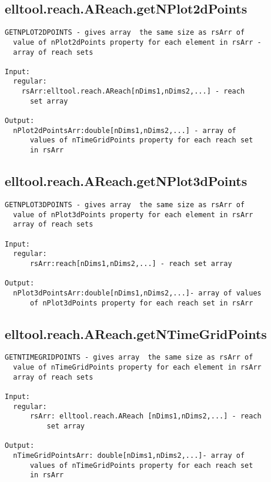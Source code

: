 \subsection{\texorpdfstring{elltool.reach.AReach.getNPlot2dPoints}{getNPlot2dPoints}}\label{method:elltool.reach.AReach.getNPlot2dPoints}
\begin{verbatim}
GETNPLOT2DPOINTS - gives array  the same size as rsArr of
  value of nPlot2dPoints property for each element in rsArr -
  array of reach sets

Input:
  regular:
    rsArr:elltool.reach.AReach[nDims1,nDims2,...] - reach
      set array

Output:
  nPlot2dPointsArr:double[nDims1,nDims2,...] - array of
      values of nTimeGridPoints property for each reach set
      in rsArr
\end{verbatim}
\subsection{\texorpdfstring{elltool.reach.AReach.getNPlot3dPoints}{getNPlot3dPoints}}\label{method:elltool.reach.AReach.getNPlot3dPoints}
\begin{verbatim}
GETNPLOT3DPOINTS - gives array  the same size as rsArr of
  value of nPlot3dPoints property for each element in rsArr
  array of reach sets

Input:
  regular:
      rsArr:reach[nDims1,nDims2,...] - reach set array

Output:
  nPlot3dPointsArr:double[nDims1,nDims2,...]- array of values
      of nPlot3dPoints property for each reach set in rsArr
\end{verbatim}
\subsection{\texorpdfstring{elltool.reach.AReach.getNTimeGridPoints}{getNTimeGridPoints}}\label{method:elltool.reach.AReach.getNTimeGridPoints}
\begin{verbatim}
GETNTIMEGRIDPOINTS - gives array  the same size as rsArr of
  value of nTimeGridPoints property for each element in rsArr
  array of reach sets

Input:
  regular:
      rsArr: elltool.reach.AReach [nDims1,nDims2,...] - reach
          set array

Output:
  nTimeGridPointsArr: double[nDims1,nDims2,...]- array of
      values of nTimeGridPoints property for each reach set
      in rsArr
\end{verbatim}
